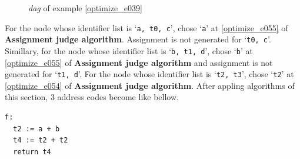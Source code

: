 \begin{Example}
\begin{figure}[htbp]
\begin{center}
\begin{latexonly}
\end{latexonly}
\caption{{\em dag} of example \ref{optimize_e039}}
\label{optimize_e040}
\end{center}
\end{figure}
For the node whose identifier list is `{\tt{a, t0, c}}',
chose `{\tt{a}}' at \ref{optimize_e055} of {\bf Assignment judge algorithm}.
Assignment is not generated for `{\tt{t0, c}}'.
Simillary, for the node whose identifier list is `{\tt{b, t1, d}}',
chose `{\tt{b}}' at \ref{optimize_e055}
of {\bf Assignment judge algorithm} and
assignment is not generated for `{\tt{t1, d}}'.
For the node whose identifier list is `{\tt{t2, t3}}',
chose `{\tt{t2}}' at \ref{optimize_e054}
of {\bf Assignment judge algorithm}.
After appling algorithms of this section,
3 address codes become like bellow.
\begin{verbatim}
f:
  t2 := a + b
  t4 := t2 + t2
  return t4
\end{verbatim}
\end{Example}

